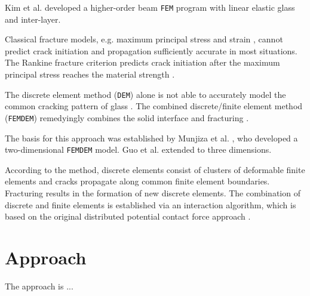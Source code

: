\documentclass[format=acmsmall, 12pt, screen=true, review=false]{acmart}
\begin{document}
\bigbreak
Kim et al. \cite{Kim16} developed a higher-order beam \texttt{FEM} program with linear elastic glass and inter-layer.

\bigbreak
Classical fracture models, e.g. maximum principal stress and strain \cite{Alt17}, cannot predict crack initiation and propagation sufficiently accurate in most situations. The Rankine fracture criterion predicts crack initiation after the maximum principal stress reaches the material strength \cite{Pel16}. 

\bigbreak
The discrete element method (\texttt{DEM}) alone is not able to accurately model the common cracking pattern of glass \cite{Che17}. The combined discrete/finite element method (\texttt{FEMDEM}) remedyingly combines the solid interface and fracturing \cite{Wan18, Mun95, Mun99, Mun12, Mun13, Guo16, Gao14, Xu14, Che18}. 

\bigbreak
The basis for this approach was established by Munjiza et al. \cite{Mun13}, who developed a two-dimensional \texttt{FEMDEM} model. Guo et al. \cite{Guo16} extended to three dimensions.

\bigbreak
According to the method, discrete elements consist of clusters of deformable finite elements and cracks propagate along common finite element boundaries. Fracturing results in the formation of new discrete elements. The combination of discrete and finite elements is established via an interaction algorithm, which is based on the original distributed potential contact force approach \cite{Mun13}. 


\section{Approach}

The approach is ... \\
\end{document}
